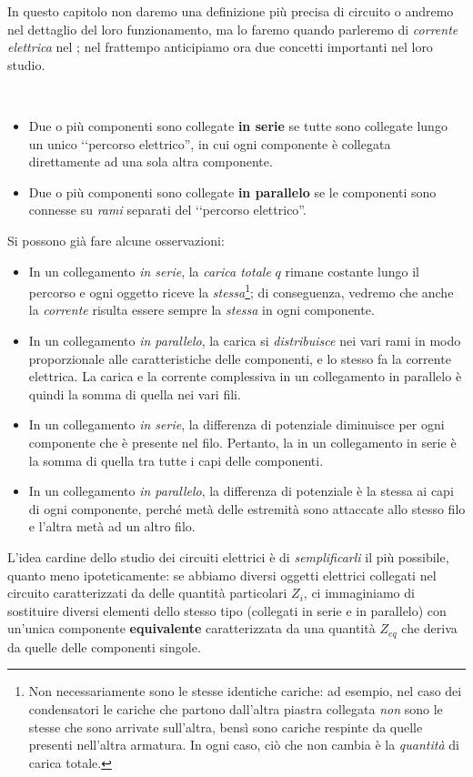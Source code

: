 In questo capitolo non daremo una definizione più precisa di circuito o andremo nel dettaglio del loro funzionamento, ma lo faremo quando parleremo di \textit{corrente elettrica} nel ; nel frattempo anticipiamo ora due concetti importanti nel loro studio.
\begin{define}~
	\begin{itemize}
		\item Due o più componenti sono collegate \textbf{in serie} se tutte sono collegate lungo un unico ‘‘percorso elettrico'', in cui ogni componente è collegata direttamente ad una sola altra componente.
		\item Due o più componenti sono collegate \textbf{in parallelo} se le componenti sono connesse su \textit{rami} separati del ‘‘percorso elettrico''.
	\end{itemize}
\end{define}
Si possono già fare alcune osservazioni:
\begin{itemize}
	\item In un collegamento \textit{in serie}, la \textit{carica totale} $q$ rimane costante lungo il percorso e ogni oggetto riceve la \textit{stessa}\footnote{Non necessariamente sono le stesse identiche cariche: ad esempio, nel caso dei condensatori le cariche che partono dall'altra piastra collegata \textit{non} sono le stesse che sono arrivate sull'altra, bensì sono cariche respinte da quelle presenti nell'altra armatura. In ogni caso, ciò che non cambia è la \textit{quantità} di carica totale.}; di conseguenza, vedremo che anche la \textit{corrente} risulta essere sempre la \textit{stessa} in ogni componente.
	\item In un collegamento \textit{in parallelo}, la carica si \textit{distribuisce} nei vari rami in modo proporzionale alle caratteristiche delle componenti, e lo stesso fa la corrente elettrica. La carica e la corrente complessiva in un collegamento in parallelo è quindi la somma di quella nei vari fili.
	\item In un collegamento \textit{in serie}, la differenza di potenziale diminuisce per ogni componente che è presente nel filo. Pertanto, la \ddp in un collegamento in serie è la somma di quella tra tutte i capi delle componenti.
	\item In un collegamento \textit{in parallelo}, la differenza di potenziale è la stessa ai capi di ogni componente, perché metà delle estremità sono attaccate allo stesso filo e l'altra metà ad un altro filo.
\end{itemize}
L'idea cardine dello studio dei circuiti elettrici è di \textit{semplificarli} il più possibile, quanto meno ipoteticamente: se abbiamo diversi oggetti elettrici collegati nel circuito caratterizzati da delle quantità particolari $Z_i$, ci immaginiamo di sostituire diversi elementi dello stesso tipo (collegati in serie e in parallelo) con un'unica componente \textbf{equivalente} caratterizzata da una quantità $Z_{eq}$ che deriva da quelle delle componenti singole.
